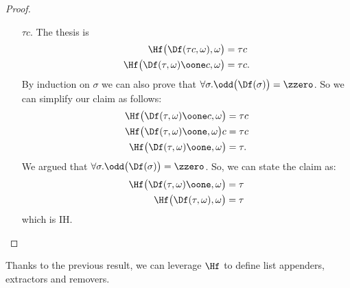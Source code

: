 \begin{conditional}{\notappendix}
\begin{proof}
\begin{itemize}
  \item[$\tau c.$] The thesis is
  \begin{align*}
  \Hf\big(\Df(\tau c,\omega),\omega\big) &= \tau c \\
  \Hf\big(\Df(\tau,\omega)\oone c, \omega\big) &=
  \tau c.
  \end{align*}
  By induction on $\sigma$ we can
  also prove that
  $\forall \sigma.\odd\big(\Df(\sigma)\big)=
  {\zzero}$.
  So we can simplify our claim as follows:
  \begin{align*}
  \Hf\big(\Df(\tau,\omega)\oone c,\omega\big) &=
  \tau c \\
  \Hf\big(\Df(\tau,\omega)\oone,\omega\big)c
  &= \tau c \\
  \Hf\big(\Df(\tau,\omega)\oone,\omega\big)
  &= \tau.
  \end{align*}
  We argued that $\forall \sigma.\odd\big(\Df(\sigma)\big)
  ={\zzero}$.
  So, we can state the claim as:
  \begin{align*}
  \Hf\big(\Df(\tau,\omega)\oone,\omega\big) &= \tau \\
  \Hf\big(\Df(\tau,\omega),\omega\big) &= \tau
  \end{align*}
  which is IH.
  \end{itemize}
  \end{proof}

  Thanks to the previous result, we can leverage $\Hf$ to define list
  appenders, extractors and removers.



\end{conditional}
